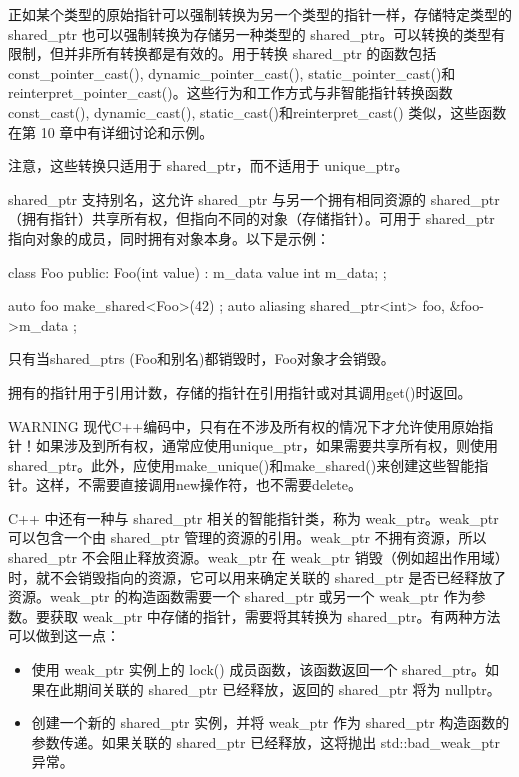 
正如某个类型的原始指针可以强制转换为另一个类型的指针一样，存储特定类型的 shared\_ptr 也可以强制转换为存储另一种类型的 shared\_ptr。可以转换的类型有限制，但并非所有转换都是有效的。用于转换 shared\_ptr 的函数包括 const\_pointer\_cast(), dynamic\_pointer\_cast(), static\_pointer\_cast()和 reinterpret\_pointer\_cast()。这些行为和工作方式与非智能指针转换函数 const\_cast(), dynamic\_cast(), static\_cast()和reinterpret\_cast() 类似，这些函数在第 10 章中有详细讨论和示例。

注意，这些转换只适用于 shared\_ptr，而不适用于 unique\_ptr。


shared\_ptr 支持别名，这允许 shared\_ptr 与另一个拥有相同资源的 shared\_ptr（拥有指针）共享所有权，但指向不同的对象（存储指针）。可用于 shared\_ptr 指向对象的成员，同时拥有对象本身。以下是示例：

\begin{cpp}
class Foo
{
    public:
    Foo(int value) : m_data { value } { }
    int m_data;
};

auto foo { make_shared<Foo>(42) };
auto aliasing { shared_ptr<int> { foo, &foo->m_data } };
\end{cpp}

只有当shared\_ptrs (Foo和别名)都销毁时，Foo对象才会销毁。

拥有的指针用于引用计数，存储的指针在引用指针或对其调用get()时返回。

\begin{myWarning}{WARNING}
现代C++编码中，只有在不涉及所有权的情况下才允许使用原始指针！如果涉及到所有权，通常应使用unique\_ptr，如果需要共享所有权，则使用shared\_ptr。此外，应使用make\_unique()和make\_shared()来创建这些智能指针。这样，不需要直接调用new操作符，也不需要delete。
\end{myWarning}


C++ 中还有一种与 shared\_ptr 相关的智能指针类，称为 weak\_ptr。weak\_ptr 可以包含一个由 shared\_ptr 管理的资源的引用。weak\_ptr 不拥有资源，所以 shared\_ptr 不会阻止释放资源。weak\_ptr 在 weak\_ptr 销毁（例如超出作用域）时，就不会销毁指向的资源，它可以用来确定关联的 shared\_ptr 是否已经释放了资源。weak\_ptr 的构造函数需要一个 shared\_ptr 或另一个 weak\_ptr 作为参数。要获取 weak\_ptr 中存储的指针，需要将其转换为 shared\_ptr。有两种方法可以做到这一点：

\begin{itemize}
\item
使用 weak\_ptr 实例上的 lock() 成员函数，该函数返回一个 shared\_ptr。如果在此期间关联的 shared\_ptr 已经释放，返回的 shared\_ptr 将为 nullptr。

\item
创建一个新的 shared\_ptr 实例，并将 weak\_ptr 作为 shared\_ptr 构造函数的参数传递。如果关联的 shared\_ptr 已经释放，这将抛出 std::bad\_weak\_ptr 异常。
\end{itemize}

